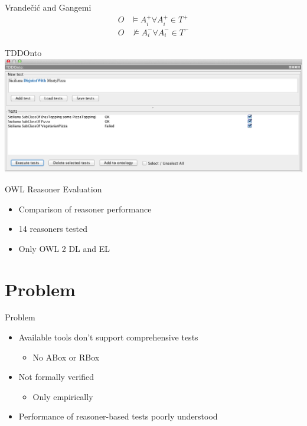 \documentclass[17pt,mathserif]{beamer}
\begin{document}
\begin{frame}{Vrande\v{c}i\'c and Gangemi}
  \begin{align*}
    O &\models A_i^{+} \forall A_i^{+} \in T^{+} \\
    O &\not\models A_i^{-} \forall A_i^{-} \in T^{-}
  \end{align*}
\end{frame}

\begin{frame}{TDDOnto}
  \includegraphics[width=\textwidth]{tddonto}
\end{frame}

\begin{frame}{OWL Reasoner Evaluation}
  \begin{itemize}
    \item Comparison of reasoner performance
    \item 14 reasoners tested
    \item Only OWL 2 DL and EL
  \end{itemize}
\end{frame}

\section{Problem}

\begin{frame}{Problem}
  \begin{itemize}
    \item Available tools don't support comprehensive tests
    \begin{itemize}
      \item No ABox or RBox
    \end{itemize}
    \item Not formally verified
    \begin{itemize}
      \item Only empirically
    \end{itemize}
    \item Performance of reasoner-based tests poorly understood
  \end{itemize}
\end{frame}
\end{document}
